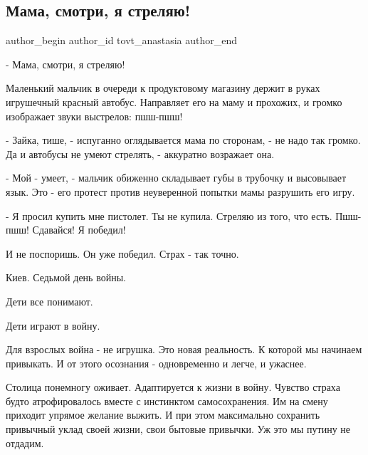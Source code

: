  
 
 
 
 
 
\subsection{Мама, смотри, я стреляю!}
\label{sec:02_03_2022.fb.tovt_anastasia.1.mama_smotri_ja_streljaju}
 
\ifcmt
 author_begin
   author_id tovt_anastasia
 author_end
\fi

- Мама, смотри, я стреляю! 

Маленький мальчик в очереди к продуктовому магазину держит в руках игрушечный
красный автобус. Направляет его на маму и прохожих, и громко изображает звуки
выстрелов: пшш-пшш!

- Зайка, тише, - испуганно оглядывается мама по сторонам, - не надо так громко.
Да и автобусы не умеют стрелять, - аккуратно возражает она.

- Мой - умеет, - мальчик обиженно складывает губы в трубочку и высовывает язык.
Это - его протест против неуверенной попытки мамы разрушить его игру. 

- Я просил купить мне пистолет. Ты не купила. Стреляю из того, что есть.
Пшш-пшш! Сдавайся! Я победил!

И не поспоришь. Он уже победил. Страх - так точно.

Киев. Седьмой день войны. 

Дети все понимают. 

Дети играют в войну. 

Для взрослых война - не игрушка. Это новая реальность. К которой мы начинаем
привыкать. И от этого осознания - одновременно и легче, и ужаснее. 

Столица понемногу оживает. Адаптируется к жизни в войну. Чувство страха будто
атрофировалось вместе с инстинктом самосохранения. Им на смену приходит упрямое
желание выжить. И при этом максимально сохранить привычный уклад своей жизни,
свои бытовые привычки. Уж это мы путину не отдадим.

